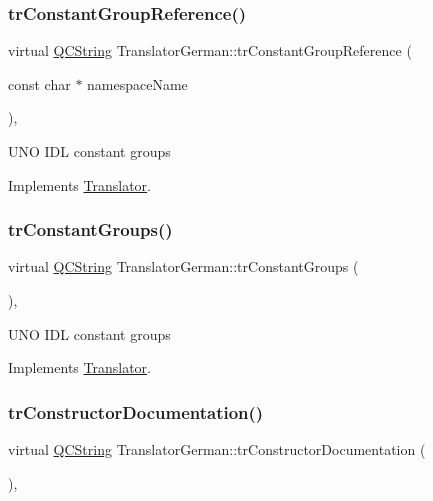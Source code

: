 \subsubsection{\texorpdfstring{trConstantGroupReference()}{trConstantGroupReference()}}
{\footnotesize\ttfamily virtual \mbox{\hyperlink{class_q_c_string}{Q\+C\+String}} Translator\+German\+::tr\+Constant\+Group\+Reference (\begin{DoxyParamCaption}\item[{const char $\ast$}]{namespace\+Name }\end{DoxyParamCaption})\hspace{0.3cm}{\ttfamily [inline]}, {\ttfamily [virtual]}}

U\+NO I\+DL constant groups 

Implements \mbox{\hyperlink{class_translator}{Translator}}.

\mbox{\label{class_translator_german_a06fc615f8229fed6228813777275880e}} 
\subsubsection{\texorpdfstring{trConstantGroups()}{trConstantGroups()}}
{\footnotesize\ttfamily virtual \mbox{\hyperlink{class_q_c_string}{Q\+C\+String}} Translator\+German\+::tr\+Constant\+Groups (\begin{DoxyParamCaption}{ }\end{DoxyParamCaption})\hspace{0.3cm}{\ttfamily [inline]}, {\ttfamily [virtual]}}

U\+NO I\+DL constant groups 

Implements \mbox{\hyperlink{class_translator}{Translator}}.

\mbox{\label{class_translator_german_ad5eed4d8901e58f80d2369a155788a34}} 
\subsubsection{\texorpdfstring{trConstructorDocumentation()}{trConstructorDocumentation()}}
{\footnotesize\ttfamily virtual \mbox{\hyperlink{class_q_c_string}{Q\+C\+String}} Translator\+German\+::tr\+Constructor\+Documentation (\begin{DoxyParamCaption}{ }\end{DoxyParamCaption})\hspace{0.3cm}{\ttfamily [inline]}, {\ttfamily [virtual]}}

